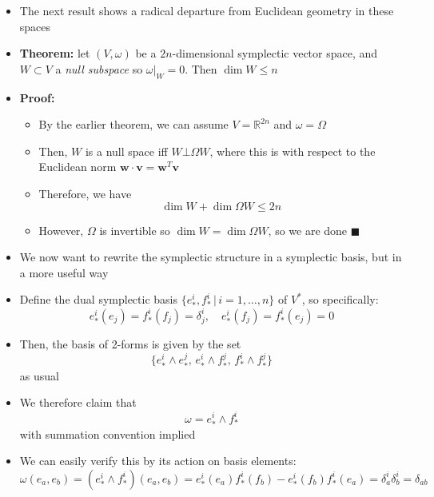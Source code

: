 \documentclass[12pt,a4paper]{article}
\numberwithin{equation}{section}
\begin{document}
\begin{itemize}
		\item The next result shows a radical departure from Euclidean geometry in these spaces
		\item \textbf{Theorem:} let $(V,\omega)$ be a $2n$-dimensional symplectic vector space, and $W\subset V$ a \textit{null subspace} so $\omega|_{W}=0$. Then $\dim{W}\leq n$
		\item \textbf{Proof:}
		\begin{itemize}
			\item By the earlier theorem, we can assume $V=\mathbb{R}^{2n}$ and $\omega=\Omega$
			\item Then, $W$ is a null space iff $W\bot \Omega W$, where this is with respect to the Euclidean norm $\mathbf{w}\cdot \mathbf{v}=\mathbf{w}^{T}\mathbf{v}$
			\item Therefore, we have
			\begin{equation}
				\dim{W}+\dim{\Omega W}\leq 2n
			\end{equation}
			\item However, $\Omega$ is invertible so $\dim{W}=\dim{\Omega W}$, so we are done $\blacksquare$
		\end{itemize}
		\item We now want to rewrite the symplectic structure in a symplectic basis, but in a more useful way
		\item Define the dual symplectic basis $\{e_{*}^{i},f_{*}^{i}\,|\,i=1,\ldots,n\}$ of $V^{*}$, so specifically:
		\begin{equation}
			e_{*}^{i}(e_{j})=f_{*}^{i}(f_{j})=\delta^{i}_{j},\quad e_{*}^{i}(f_{j})=f_{*}^{i}(e_{j})=0
		\end{equation}
		\item Then, the basis of 2-forms is given by the set
		\begin{equation}
			\{e_{*}^{i}\wedge e_{*}^{j},\,e_{*}^{i}\wedge f_{*}^{j},\,f_{*}^{i}\wedge f_{*}^{j}\}
		\end{equation}
		as usual
		\item We therefore claim that
		\begin{equation}
			\omega = e_{*}^{i}\wedge f_{*}^{i}
		\end{equation}
		with summation convention implied
		\item We can easily verify this by its action on basis elements:
		\begin{equation}
			\omega(e_{a},e_{b})=(e_{*}^{i}\wedge f_{*}^{i})(e_{a},e_{b})=e_{*}^{i}(e_{a})f_{*}^{i}(f_{b})-e_{*}^{i}(f_{b})f_{*}^{i}(e_{a})=\delta^{i}_{a}\delta^{i}_{b}=\delta_{ab}

\end{equation}
\end{itemize}
\end{document}
